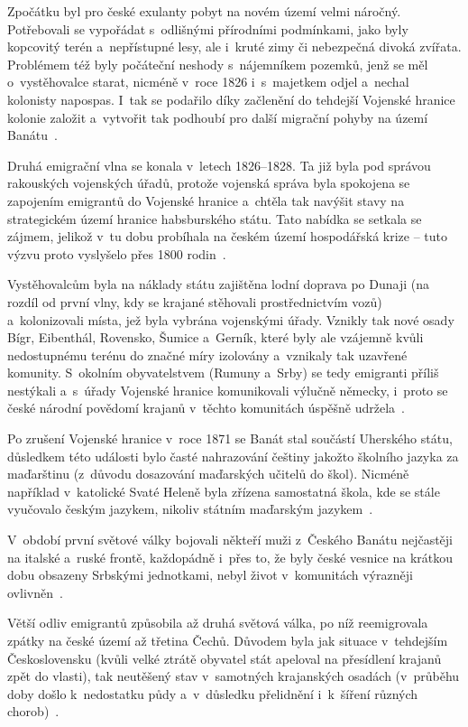 Zpočátku byl pro české exulanty pobyt na novém území velmi náročný. Potřebovali se vypořádat s~odlišnými přírodními podmínkami, jako byly kopcovitý terén a~nepřístupné lesy, ale i~kruté zimy či nebezpečná divoká zvířata. Problémem též byly počáteční neshody s~nájemníkem pozemků, jenž se měl o~vystěhovalce starat, nicméně v~roce 1826 i~s~majetkem odjel a~nechal kolonisty napospas. I~tak se podařilo díky začlenění do tehdejší Vojenské hranice kolonie založit a~vytvořit tak podhoubí pro další migrační pohyby na území Banátu~\parencite{Secka1995}.

Druhá emigrační vlna se konala v~letech 1826--1828. Ta již byla pod správou rakouských vojenských úřadů, protože vojenská správa byla spokojena se zapojením emigrantů do Vojenské hranice a~chtěla tak navýšit stavy na strategickém území hranice habsburského státu. Tato nabídka se setkala se zájmem, jelikož v~tu dobu probíhala na českém území hospodářská krize -- tuto výzvu proto vyslyšelo přes 1800 rodin~\parencite{Frnochova2012}.

Vystěhovalcům byla na náklady státu zajištěna lodní doprava po Dunaji (na rozdíl od první vlny, kdy se krajané stěhovali prostřednictvím vozů) a~kolonizovali místa, jež byla vybrána vojenskými úřady. Vznikly tak nové osady Bígr, Eibenthál, Rovensko, Šumice a~Gerník, které byly ale vzájemně kvůli nedostupnému terénu do značné míry izolovány a~vznikaly tak uzavřené komunity. S~okolním obyvatelstvem (Rumuny a~Srby) se tedy emigranti příliš nestýkali a~s~úřady Vojenské hranice komunikovali výlučně německy, i~proto se české národní povědomí krajanů v~těchto komunitách úspěšně udržela~\parencite{Secka1995}.

Po zrušení Vojenské hranice v~roce 1871 se Banát stal součástí Uherského státu, důsledkem této události bylo časté nahrazování češtiny jakožto školního jazyka za maďarštinu (z~důvodu dosazování maďarských učitelů do škol). Nicméně například v~katolické Svaté Heleně byla zřízena samostatná škola, kde se stále vyučovalo českým jazykem, nikoliv státním maďarským jazykem~\parencite{Gecse2013}.

V~období první světové války bojovali někteří muži z~Českého Banátu nejčastěji na italské a~ruské frontě, každopádně i~přes to, že byly české vesnice na krátkou dobu obsazeny Srbskými jednotkami, nebyl život v~komunitách výrazněji ovlivněn~\parencite{Gecse2013}.

Větší odliv emigrantů způsobila až druhá světová válka, po níž reemigrovala zpátky na české území až třetina Čechů. Důvodem byla jak situace v~tehdejším Československu (kvůli velké ztrátě obyvatel stát apeloval na přesídlení krajanů zpět do vlasti), tak neutěšený stav v~samotných krajanských osadách (v~průběhu doby došlo k~nedostatku půdy a~v~důsledku přelidnění i~k~šíření různých chorob)~\parencite{Secka1995}.

